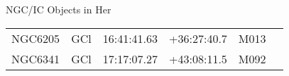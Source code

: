 \begin{block}{NGC/IC Objects in Her}
  \centering
  \begin{tabularx}{\textwidth}{llrrll} \toprule 
    NGC6205 & GCl & 16:41:41.63 & +36:27:40.7  & M013 \\ 
    NGC6341 & GCl & 17:17:07.27 & +43:08:11.5  & M092 \\ 
  \end{tabularx}
\end{block}